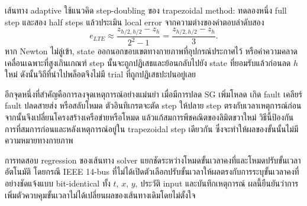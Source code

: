 \documentclass[12pt,a4paper]{article}
\begin{document}
เส้นทาง adaptive ใช้แนวคิด step-doubling ของ trapezoidal method: ทดลองหนึ่ง full step และสอง half steps แล้วประเมิน local error จากความต่างของคำตอบลำดับสอง
\begin{equation}
e_{LTE}\approx\frac{z_{h/2,h/2}-z_h}{2^2-1}=\frac{z_{h/2,h/2}-z_h}{3}.
\label{eq:lte_summary}
\end{equation}
หาก Newton ไม่ลู่เข้า, state ออกนอกขอบเขตทางกายภาพที่อุปกรณ์ประกาศไว้ หรือค่าความคลาดเคลื่อนเฉพาะที่สูงเกินเกณฑ์ step นั้นจะถูกปฏิเสธและย้อนกลับไปยัง state ที่ยอมรับแล้วก่อนลด $h$ ใหม่ ดังนั้นวิถีที่นำไปพล็อตจึงไม่มี trial ที่ถูกปฏิเสธปะปนอยู่เลย

อีกจุดหนึ่งที่สำคัญคือการลงจุดเหตุการณ์อย่างแม่นยำ เมื่อมีการปลด SG เพิ่มโหลด เกิด fault เคลียร์ fault ปลดสายส่ง หรือสลับโหมด ตัวอินทิเกรตจะตัด step ให้ปลาย step ตรงกับเวลาเหตุการณ์ก่อน จากนั้นจึงเปลี่ยนโครงสร้างเครือข่ายหรือโหมด แล้วแก้สมการพีชคณิตของลิมิตขวาใหม่ วิธีนี้ป้องกันการที่สมการก่อนและหลังเหตุการณ์อยู่ใน trapezoidal step เดียวกัน ซึ่งจะทำให้ผลของขั้นนั้นไม่มีความหมายทางกายภาพ

การทดสอบ regression ของเส้นทาง solver แยกชัดระหว่างโหมดขั้นเวลาคงที่และโหมดปรับขั้นเวลาอัตโนมัติ โดยกรณี IEEE 14-bus ที่ไม่ได้เปิดตัวเลือกปรับขั้นเวลาให้ผลตรงกับการระบุขั้นเวลาคงที่อย่างชัดแจ้งแบบ bit-identical ทั้ง $t$, $x$, $y$, ประวัติ input และบันทึกเหตุการณ์ ผลนี้ยืนยันว่าการเพิ่มตัวควบคุมขั้นเวลาไม่ได้เปลี่ยนผลของเส้นทางเดิมโดยไม่ตั้งใจ
\end{document}
